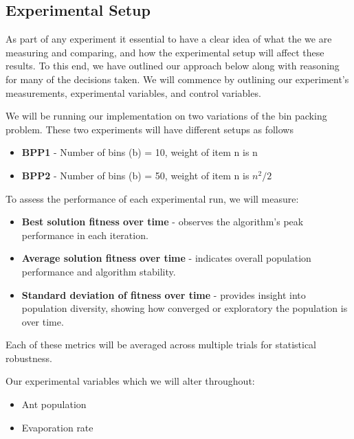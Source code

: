 \documentclass[sigconf]{acmart}
\begin{document}
        \subsection{Experimental Setup}
            As part of any experiment it essential to have a clear idea of what the we are measuring and comparing, and how the experimental setup will affect these results. To this end, we have outlined our approach below along with reasoning for many of the decisions taken. We will commence by outlining our experiment's measurements, experimental variables, and control variables. 
            
            We will be running our implementation on two variations of the bin packing problem. These two experiments will have different setups as follows
            \begin{itemize}
                \item \textbf{BPP1} - Number of bins (b) = 10, weight of item n is n
                \item \textbf{BPP2} - Number of bins (b) = 50, weight of item n is $n^2/2$\newline
            \end{itemize}

            To assess the performance of each experimental run, we will measure:
            \begin{itemize}
                \item \textbf{Best solution fitness over time} - observes the algorithm’s peak performance in each iteration.
                \item \textbf{Average solution fitness over time} - indicates overall population performance and algorithm stability.
                \item \textbf{Standard deviation of fitness over time} - provides insight into population diversity, showing how converged or exploratory the population is over time.
            \end{itemize}
            
            Each of these metrics will be averaged across multiple trials for statistical robustness.\newline
            
            Our experimental variables which we will alter throughout:
            \begin{itemize}
                \item Ant population
                \item Evaporation rate\newline
            \end{itemize}
\end{document}

